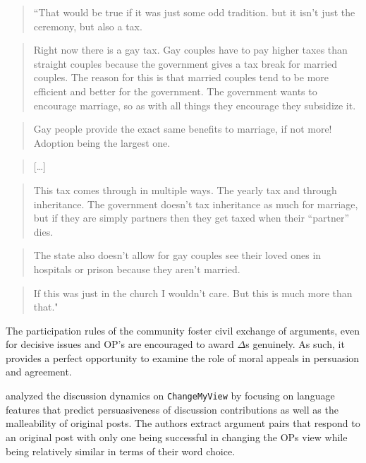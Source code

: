 \documentclass[12pt,]{article}
\begin{document}
\begin{quote}
``That would be true if it was just some odd tradition. but it isn't
just the ceremony, but also a tax.
\end{quote}

\begin{quote}
Right now there is a gay tax. Gay couples have to pay higher taxes than
straight couples because the government gives a tax break for married
couples. The reason for this is that married couples tend to be more
efficient and better for the government. The government wants to
encourage marriage, so as with all things they encourage they subsidize
it.
\end{quote}

\begin{quote}
Gay people provide the exact same benefits to marriage, if not more!
Adoption being the largest one.
\end{quote}

\begin{quote}
{[}\ldots{}{]}
\end{quote}

\begin{quote}
This tax comes through in multiple ways. The yearly tax and through
inheritance. The government doesn't tax inheritance as much for
marriage, but if they are simply partners then they get taxed when their
``partner'' dies.
\end{quote}

\begin{quote}
The state also doesn't allow for gay couples see their loved ones in
hospitals or prison because they aren't married.
\end{quote}

\begin{quote}
If this was just in the church I wouldn't care. But this is much more
than that."
\end{quote}

The participation rules of the community foster civil exchange of
arguments, even for decisive issues and OP's are encouraged to award
\(\Delta\)s genuinely. As such, it provides a perfect opportunity to
examine the role of moral appeals in persuasion and agreement.

\citet{tan2016winning} analyzed the discussion dynamics on
\texttt{ChangeMyView} by focusing on language features that predict
persuasiveness of discussion contributions as well as the malleability
of original posts. The authors extract argument pairs that respond to an
original post with only one being successful in changing the OPs view
while being relatively similar in terms of their word choice.
\end{document}
